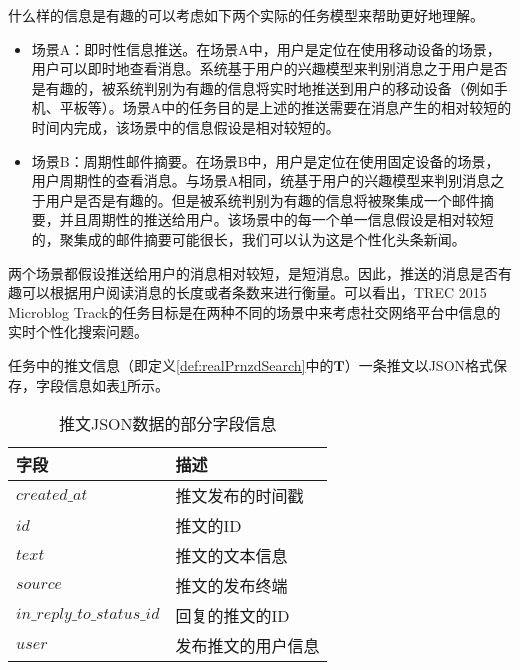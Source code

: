 什么样的信息是有趣的可以考虑如下两个实际的任务模型来帮助更好地理解。
\begin{itemize}
  \item 场景A：即时性信息推送。在场景A中，用户是定位在使用移动设备的场景，用户可以即时地查看消息。系统基于用户的兴趣模型来判别消息之于用户是否是有趣的，被系统判别为有趣的信息将实时地推送到用户的移动设备（例如手机、平板等）。场景A中的任务目的是上述的推送需要在消息产生的相对较短的时间内完成，该场景中的信息假设是相对较短的。
  \item 场景B：周期性邮件摘要。在场景B中，用户是定位在使用固定设备的场景，用户周期性的查看消息。与场景A相同，统基于用户的兴趣模型来判别消息之于用户是否是有趣的。但是被系统判别为有趣的信息将被聚集成一个邮件摘要，并且周期性的推送给用户。该场景中的每一个单一信息假设是相对较短的，聚集成的邮件摘要可能很长，我们可以认为这是个性化头条新闻。
\end{itemize}

两个场景都假设推送给用户的消息相对较短，是短消息。因此，推送的消息是否有趣可以根据用户阅读消息的长度或者条数来进行衡量。可以看出，TREC 2015 Microblog Track的任务目标是在两种不同的场景中来考虑社交网络平台中信息的实时个性化搜索问题。

任务中的推文信息（即定义\ref{def:realPrnzdSearch}中的$\mathbf{T}$）一条推文以JSON格式保存，字段信息如表\ref{tab:tweetJSON}所示。
\begin{table}[!htbp]
\centering
\caption{推文JSON数据的部分字段信息}
\begin{tabular}{|p{4cm}|p{7cm}|}
\hline
\textbf{字段} & \textbf{描述} \\
\hline
$created\_at$ & 推文发布的时间戳\\
\hline
$id$ & 推文的ID\\
\hline
$text$ & 推文的文本信息\\
\hline
$source$ & 推文的发布终端\\
\hline
$in\_reply\_to\_status\_id$ & 回复的推文的ID\\
\hline
$user$ & 发布推文的用户信息\\
\hline
\end{tabular}
\label{tab:tweetJSON}
\end{table}

